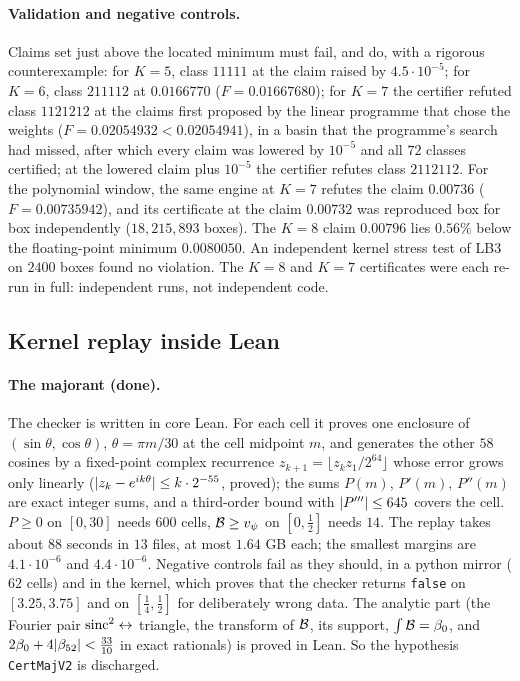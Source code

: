\paragraph{Validation and negative controls.} Claims set just above the located minimum must fail, and do, with a rigorous counterexample:
for $K=5$, class $11111$ at the claim raised by $4.5\cdot10^{-5}$; for $K=6$, class $211112$ at $0.0166770$ ($F=0.01667680$); for $K=7$ the
certifier refuted class $1121212$ at the claims first proposed by the linear programme that chose the weights ($F=0.02054932<0.02054941$), in a
basin that the programme's search had missed, after which every claim was lowered by $10^{-5}$ and all $72$ classes certified; at the
lowered claim plus $10^{-5}$ the certifier refutes class $2112112$. For the polynomial window, the same engine at $K=7$ refutes the claim $0.00736$
($F=0.00735942$), and its certificate at the claim $0.00732$ was reproduced box for box independently ($18{,}215{,}893$ boxes). The
$K=8$ claim $0.00796$ lies $0.56\%$ below the floating-point minimum $0.0080050$. An independent kernel stress test of LB3 on $2400$ boxes found no
violation. The $K=8$ and $K=7$ certificates were each re-run in full: independent runs, not independent code.

\subsection{Kernel replay inside Lean}\label{ssec:replay}
\paragraph{The majorant (done).} The checker is written in core Lean. For each cell it proves one enclosure of $(\sin\theta,\cos\theta)$, $\theta=\pi m/30$
at the cell midpoint $m$, and generates the other $58$ cosines by a fixed-point complex recurrence $z_{k+1}=\lfloor z_kz_1/2^{64}\rfloor$ whose error
grows only linearly ($\lvert z_k-e^{ik\theta}\rvert\le k\cdot2^{-55}$, proved); the sums $P(m)$, $P'(m)$, $P''(m)$ are exact integer sums, and a third-order
bound with $\lvert P'''\rvert\le645$ covers the cell. $P\ge0$ on $[0,30]$ needs $600$ cells, $\mathcal B\ge v_\psi$ on $[0,\frac12]$ needs $14$. The replay takes
about $88$ seconds in $13$ files, at most $1.64$ GB each; the smallest margins are $4.1\cdot10^{-6}$ and $4.4\cdot10^{-6}$. Negative controls fail as
they should, in a python mirror ($62$ cells) and in the kernel, which proves that the checker returns \texttt{false} on $[3.25,3.75]$ and on
$[\frac14,\frac12]$ for deliberately wrong data. The analytic part (the Fourier pair $\operatorname{sinc}^2\leftrightarrow$ triangle, the transform of $\mathcal B$, its
support, $\int\mathcal B=\beta_0$, and $2\beta_0+4\lvert \beta_{52}\rvert<\frac{33}{10}$ in exact rationals) is proved in Lean. So the hypothesis \texttt{CertMajV2}
is discharged.

